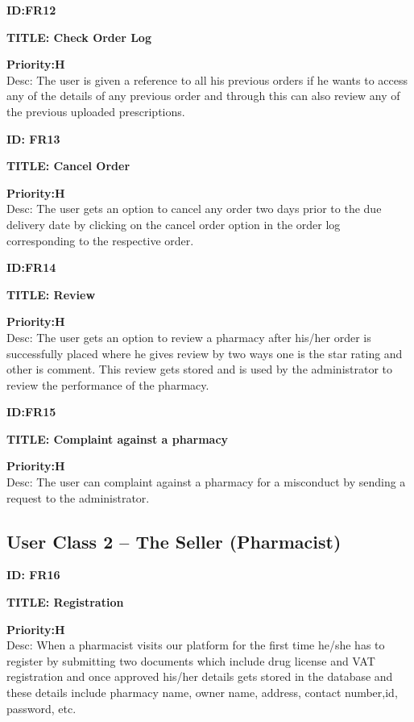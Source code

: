 \documentclass{scrreprt}
\begin{document}
\item \textbf{ID:FR12}
\item \textbf{TITLE: Check Order Log}
\item \textbf{Priority:H}\\
Desc: The user is given a reference to all his previous orders if he wants to access any of the details of any previous order and through this can also review any of the previous uploaded prescriptions.\\

\item \textbf{ID: FR13}
\item \textbf{TITLE: Cancel Order}
\item \textbf{Priority:H}\\
Desc: The user gets an option to cancel any order two days prior to the due delivery date by clicking on the cancel order option in the order log corresponding to the respective order.\\

\item \textbf{ID:FR14}
\item \textbf{TITLE: Review}
\item \textbf{Priority:H}\\
Desc: The user gets an option to review a pharmacy after his/her order is successfully placed where he gives review by two ways one is the star rating and other is comment. This review gets stored and is used by the administrator to review the performance of the pharmacy.\\

\item \textbf{ID:FR15}
\item \textbf{TITLE: Complaint against a pharmacy}
\item \textbf{Priority:H}\\
Desc: The user can complaint against a pharmacy for a misconduct by sending a request to the administrator.

\subsection{User Class 2 – The Seller (Pharmacist)}  
 
\item \textbf{ID: FR16}
\item \textbf{TITLE: Registration}
\item \textbf{Priority:H}\\
Desc: When a pharmacist visits our platform for the first time he/she has to register by submitting two documents which include drug license and VAT registration and once approved his/her details gets stored in the database and these details include pharmacy name, owner name, address, contact number,id, password, etc.\\
\end{document}
